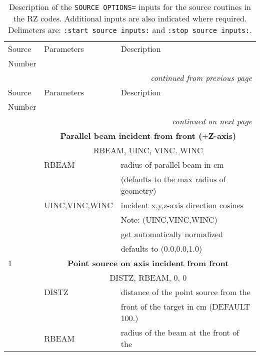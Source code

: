 
\begin{longtable}{lll}
\caption[Description of source options for the RZ codes]
{Description of the {\tt SOURCE OPTIONS=} inputs for the source 
routines in the RZ codes.  Additional inputs are also indicated
where required.  Delimeters are: {\tt :start source inputs:} 
and {\tt :stop source inputs:}.}\\
\hline\hline
Source & Parameters & Description \\
Number &&\\
\hline
\endfirsthead
\hline
\multicolumn{3}{r}{\small\slshape continued from previous page} \\
\hline \hline
Source & Parameters      & Description \\
Number &&\\
\hline
\endhead
\hline
\multicolumn{3}{r}{\small\slshape continued on next page} \\ \hline
\endfoot
\hline \hline
\endlastfoot
0 & \multicolumn{2}{c}{\bf Parallel beam incident from front ($+$Z-axis)}\\
  & \multicolumn{2}{c}{      RBEAM, UINC, VINC, WINC}\\
  & RBEAM   & radius of parallel beam in cm       \\
  &         & (defaults to the max radius of geometry)\\
  & UINC,VINC,WINC    & incident x,y,z-axis direction cosines \\
  &                & Note: (UINC,VINC,WINC) \\
  &                & get automatically normalized \\
  &                 &  defaults to (0.0,0.0,1.0) \\
\hline
1 & \multicolumn{2}{c}{\bf Point source on axis incident from front}\\
  & \multicolumn{2}{c}{      DISTZ, RBEAM, 0, 0}\\
  & DISTZ   & distance of the point source from the\\
  &                & front of the target in cm (DEFAULT 100.)\\
  & RBEAM   & radius of the beam at the front of the\\

\end{longtable}
